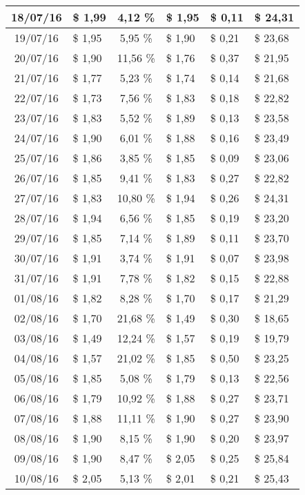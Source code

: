 \begin{center}
\begin{small}
\begin{longtable}{|c|l|c|l|l|l|}
18/07/16 & \$ 1,99 & 4,12 \% & \$ 1,95 & \$ 0,11 & \$ 24,31 \\ \hline
19/07/16 & \$ 1,95 & 5,95 \% & \$ 1,90 & \$ 0,21 & \$ 23,68 \\ \hline
20/07/16 & \$ 1,90 & 11,56 \% & \$ 1,76 & \$ 0,37 & \$ 21,95 \\ \hline
21/07/16 & \$ 1,77 & 5,23 \% & \$ 1,74 & \$ 0,14 & \$ 21,68 \\ \hline
22/07/16 & \$ 1,73 & 7,56 \% & \$ 1,83 & \$ 0,18 & \$ 22,82 \\ \hline
23/07/16 & \$ 1,83 & 5,52 \% & \$ 1,89 & \$ 0,13 & \$ 23,58 \\ \hline
24/07/16 & \$ 1,90 & 6,01 \% & \$ 1,88 & \$ 0,16 & \$ 23,49 \\ \hline
25/07/16 & \$ 1,86 & 3,85 \% & \$ 1,85 & \$ 0,09 & \$ 23,06 \\ \hline
26/07/16 & \$ 1,85 & 9,41 \% & \$ 1,83 & \$ 0,27 & \$ 22,82 \\ \hline
27/07/16 & \$ 1,83 & 10,80 \% & \$ 1,94 & \$ 0,26 & \$ 24,31 \\ \hline
28/07/16 & \$ 1,94 & 6,56 \% & \$ 1,85 & \$ 0,19 & \$ 23,20 \\ \hline
29/07/16 & \$ 1,85 & 7,14 \% & \$ 1,89 & \$ 0,11 & \$ 23,70 \\ \hline
30/07/16 & \$ 1,91 & 3,74 \% & \$ 1,91 & \$ 0,07 & \$ 23,98 \\ \hline
31/07/16 & \$ 1,91 & 7,78 \% & \$ 1,82 & \$ 0,15 & \$ 22,88 \\ \hline
01/08/16 & \$ 1,82 & 8,28 \% & \$ 1,70 & \$ 0,17 & \$ 21,29 \\ \hline
02/08/16 & \$ 1,70 & 21,68 \% & \$ 1,49 & \$ 0,30 & \$ 18,65 \\ \hline
03/08/16 & \$ 1,49 & 12,24 \% & \$ 1,57 & \$ 0,19 & \$ 19,79 \\ \hline
04/08/16 & \$ 1,57 & 21,02 \% & \$ 1,85 & \$ 0,50 & \$ 23,25 \\ \hline
05/08/16 & \$ 1,85 & 5,08 \% & \$ 1,79 & \$ 0,13 & \$ 22,56 \\ \hline
06/08/16 & \$ 1,79 & 10,92 \% & \$ 1,88 & \$ 0,27 & \$ 23,71 \\ \hline
07/08/16 & \$ 1,88 & 11,11 \% & \$ 1,90 & \$ 0,27 & \$ 23,90 \\ \hline
08/08/16 & \$ 1,90 & 8,15 \% & \$ 1,90 & \$ 0,20 & \$ 23,97 \\ \hline
09/08/16 & \$ 1,90 & 8,47 \% & \$ 2,05 & \$ 0,25 & \$ 25,84 \\ \hline
10/08/16 & \$ 2,05 & 5,13 \% & \$ 2,01 & \$ 0,21 & \$ 25,43 \\ \hline

\end{longtable}
\end{small}
\end{center}
